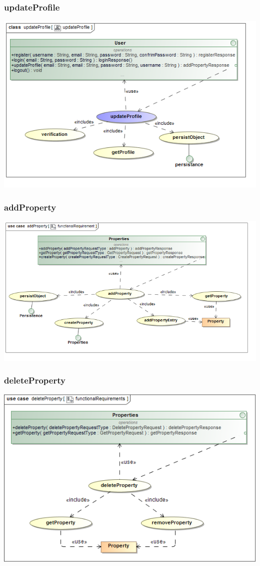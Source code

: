 \documentclass[a4paper,12pt]{article}
\begin{document}
\subsubsection{updateProfile}
\includegraphics[width=1\textwidth]{./Images/newDiagrams/requiredFunctionality/Diana/updateProfile.png}

\subsubsection{addProperty}
\includegraphics[width=1\textwidth]{./Images/requiredFunctionality/addProperty.png}
\subsubsection{deleteProperty}
\includegraphics[width=1\textwidth]{./Images/requiredFunctionality/deleteProperty.png}
\end{document}
